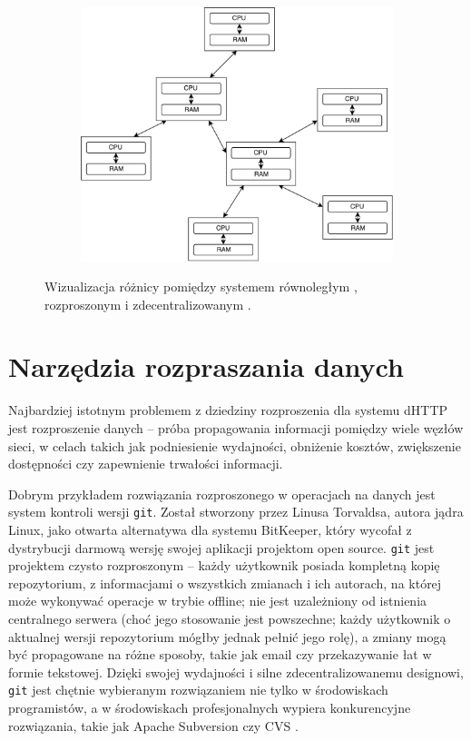 \begin{figure}[h]
\begin{subfigure}{0.6\textwidth}
		\centering
		\includegraphics[scale=0.5]{decentralized.pdf}
		\subcaption{\label{subfigure_c}}
	\end{subfigure}
	
	\caption{\label{fig:concurrentVsParalell}Wizualizacja różnicy pomiędzy systemem równoległym \protect{}, rozproszonym \protect{} i zdecentralizowanym \protect{}.}

\end{figure}

\section{Narzędzia rozpraszania danych}
\label{sec:narzedzia}
Najbardziej istotnym problemem z dziedziny rozproszenia dla systemu dHTTP jest rozproszenie danych -- próba propagowania informacji pomiędzy wiele węzłów sieci, w celach takich jak podniesienie wydajności, obniżenie kosztów, zwiększenie dostępności czy zapewnienie trwałości informacji.

Dobrym przykładem rozwiązania rozproszonego w operacjach na danych jest system kontroli wersji \texttt{git}.
Został stworzony przez Linusa Torvaldsa, autora jądra Linux, jako otwarta alternatywa dla systemu BitKeeper, który wycofał z dystrybucji darmową wersję swojej aplikacji projektom open source.
\texttt{git} jest projektem czysto rozproszonym -- każdy użytkownik posiada kompletną kopię repozytorium, z informacjami o wszystkich zmianach i ich autorach, na której może wykonywać operacje w trybie offline; nie jest uzależniony od istnienia centralnego serwera (choć jego stosowanie jest powszechne; każdy użytkownik o aktualnej wersji repozytorium mógłby jednak pełnić jego rolę), a zmiany mogą być propagowane na różne sposoby, takie jak email czy przekazywanie łat w formie tekstowej. Dzięki swojej wydajności i silne zdecentralizowanemu designowi, \texttt{git} jest chętnie wybieranym rozwiązaniem nie tylko w środowiskach programistów, a w środowiskach profesjonalnych wypiera konkurencyjne rozwiązania, takie jak Apache Subversion czy CVS \cite{ram2013git}.

